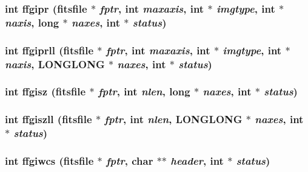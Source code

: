 \subsubsection{\setlength{\rightskip}{0pt plus 5cm}int ffgipr (\bf{fitsfile} $\ast$ {\em fptr}, int {\em maxaxis}, int $\ast$ {\em imgtype}, int $\ast$ {\em naxis}, long $\ast$ {\em naxes}, int $\ast$ {\em status})}\label{fitsio_8h_36cf874c199041ee45957859c011adc4}


\subsubsection{\setlength{\rightskip}{0pt plus 5cm}int ffgiprll (\bf{fitsfile} $\ast$ {\em fptr}, int {\em maxaxis}, int $\ast$ {\em imgtype}, int $\ast$ {\em naxis}, \bf{LONGLONG} $\ast$ {\em naxes}, int $\ast$ {\em status})}\label{fitsio_8h_bf531fec534d692d887dc85d0c415611}


\subsubsection{\setlength{\rightskip}{0pt plus 5cm}int ffgisz (\bf{fitsfile} $\ast$ {\em fptr}, int {\em nlen}, long $\ast$ {\em naxes}, int $\ast$ {\em status})}\label{fitsio_8h_8d84fada6d2b3d4c9e4153716437728c}


\subsubsection{\setlength{\rightskip}{0pt plus 5cm}int ffgiszll (\bf{fitsfile} $\ast$ {\em fptr}, int {\em nlen}, \bf{LONGLONG} $\ast$ {\em naxes}, int $\ast$ {\em status})}\label{fitsio_8h_9f3109f783dd55f01dd7e8130e9c355a}


\subsubsection{\setlength{\rightskip}{0pt plus 5cm}int ffgiwcs (\bf{fitsfile} $\ast$ {\em fptr}, char $\ast$$\ast$ {\em header}, int $\ast$ {\em status})}\label{fitsio_8h_4a3092c0f23da761c8063c15c1aba03e}



